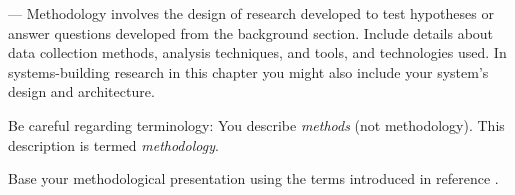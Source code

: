 %

%
%

--- Methodology involves the design of research developed to test
hypotheses or answer questions developed from the background section. Include
details about data collection methods, analysis techniques, and tools, and
technologies used. In systems-building research in this chapter you might also
include your system's design and architecture.

Be careful regarding terminology: You describe \emph{methods} (not
methodology). This description is termed \emph{methodology}.

Base your methodological presentation using the terms introduced in reference
\cite{SF18}.

